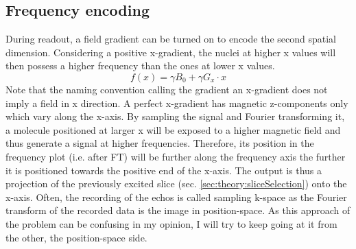         \subsection{Frequency encoding}
            During readout, a field gradient can be turned on to encode the second spatial dimension. Considering a positive x-gradient, the nuclei at higher x values will then possess a higher frequency than the ones at lower x values.
            \begin{equation}
                f(x) = \gamma B_0 + \gamma G_x \cdot x
            \end{equation}
            Note that the naming convention calling the gradient an x-gradient does not imply a field in x direction. A perfect x-gradient has magnetic z-components only which vary along the x-axis. By sampling the signal and Fourier transforming it, a molecule positioned at larger x will be exposed to a higher magnetic field and thus generate a signal at higher frequencies. Therefore, its position in the frequency plot (i.e. after FT) will be further along the frequency axis the further it is positioned towards the positive end of the x-axis. The output is thus a projection of the previously excited slice (sec. \ref{sec:theory:sliceSelection}) onto the x-axis.
            Often, the recording of the echos is called sampling k-space as the Fourier transform of the recorded data is the image in position-space. As this approach of the problem can be confusing in my opinion, I will try to keep going at it from the other, the position-space side.
